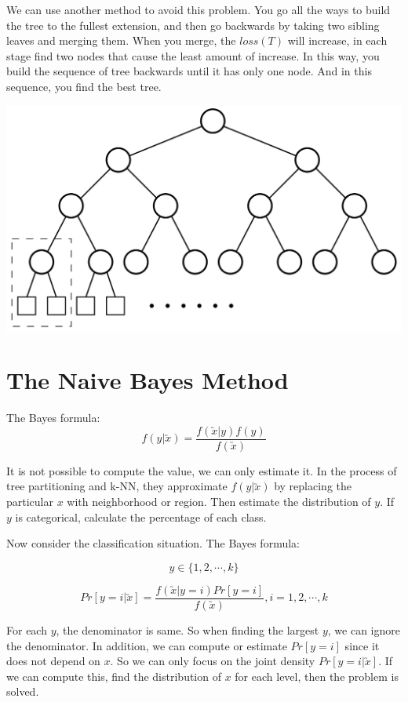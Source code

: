 \documentclass{article}
\begin{document}
{{We can use another method to avoid this problem. You go all the ways to build the tree to the fullest extension, and then go backwards by taking two sibling leaves and merging them. When you merge, the  $\mathit{loss}(T)$ will increase, in each stage find two nodes that cause the least amount of increase. In this way, you build the sequence of tree backwards until it has only one node. And in this sequence, you find the best tree.

 \begin{center}
 	\includegraphics[scale=0.45]{images/BackwardTree.png}
 \end{center}  
 
\section{The Naive Bayes Method}{
	The Bayes formula:	\[\mathit{f}(y|\utilde{x})=\frac{\mathit{f}(\utilde{x}|y)\mathit{f}(y)}{\mathit{f}(\utilde{x})}\]
	
	It is not possible to compute the value, we can only estimate it.
	In the process of tree partitioning and k-NN, they approximate $\mathit{f}(y|\utilde{x})$ by replacing the particular $x$ with neighborhood or region. Then estimate the distribution of $y$. If $y$ is categorical, calculate the percentage of each class.
	
	Now consider the classification situation.
	The Bayes formula:
	
	\[\mathit{y} \in \{1,2,\cdots ,k\}\]
	
	\[Pr[y=i|\utilde{x}]=\frac{\mathit{f}(\utilde{x}|y=i)Pr[y=i]}{\mathit{f}(\utilde{x})}, i=1,2,\cdots ,k\]

	For each $y$, the denominator is same. So when finding the largest $y$, we can ignore the denominator. In addition, we can compute or estimate $Pr[y=i]$ since it does not depend on $x$. So we can only focus on the joint density \(Pr[y=i|\utilde{x}]\). If we can compute this, find the distribution of $x$ for each level, then the problem is solved.
	
}}}
\end{document}
